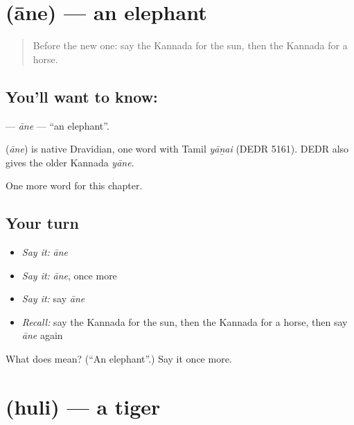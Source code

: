 \section[\texorpdfstring{\kn{ಆನೆ} (āne)}{ಆನೆ (āne)}]{ (āne) — an elephant}

\label{lesson:KA-C129-ane}



\begin{quote}
Before the new one: say the Kannada for the sun, then the Kannada for a horse.
\end{quote}

\subsection*{You'll want to know: }
\textbf{} — \emph{āne} — \textquotedblleft{}an elephant\textquotedblright{}.

\begin{cousinweb}
\textbf{} (\emph{āne}) is native Dravidian, one word with Tamil \emph{yāṉai} (DEDR 5161). DEDR also gives the older Kannada \emph{yāne}.
\end{cousinweb}

\begin{grammarlens}[title={What you've built}]
One more word for this chapter.
\end{grammarlens}

\subsection*{Your turn}
\begin{itemize}
\raggedright
  \item \emph{Say it:} \emph{āne}
  \item \emph{Say it:} \emph{āne}, once more
  \item \emph{Say it:} say \emph{āne}
  \item \emph{Recall:} say the Kannada for the sun, then the Kannada for a horse, then say \emph{āne} again
\end{itemize}

\begin{tcolorbox}[breakable,colback=teal!4,colframe=teal!35!black,title={Before you move on}]
What does  mean? (\textquotedblleft{}An elephant\textquotedblright{}.) Say it once more.
\end{tcolorbox}
\section[\texorpdfstring{\kn{ಹುಲಿ} (huli)}{ಹುಲಿ (huli)}]{ (huli) — a tiger}

